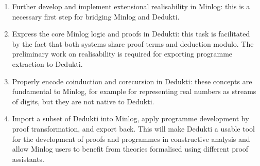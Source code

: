 
\begin{enumerate}
\item Further develop and implement extensional realisability in Minlog: this is
  a necessary first step for bridging Minlog and Dedukti.
\item Express the core Minlog logic and proofs in Dedukti: this task is
  facilitated by the fact that both systems share proof terms and deduction
  modulo. The preliminary work on realisability is required for exporting
  programme extraction to Dedukti.
\item Properly encode coinduction and corecursion in Dedukti: these concepts are
  fundamental to Minlog, for example for representing real numbers as streams of
  digits, but they are not native to Dedukti.
\item Import a subset of Dedukti into Minlog, apply programme development by proof
  transformation, and export back. This will make Dedukti a usable tool for the
  development of proofs and programmes in constructive analysis and allow Minlog
  users to benefit from theories formalised using different proof assistants.
\end{enumerate}




